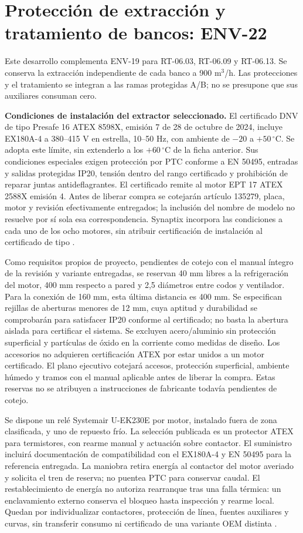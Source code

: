 \section{Protección de extracción y tratamiento de bancos: ENV-22}
\label{sec:ambiente-env22}
Este desarrollo complementa ENV-19 para RT-06.03, RT-06.09 y RT-06.13. Se conserva la extracción independiente de cada banco a 900 m$^3$/h. Las protecciones y el tratamiento se integran a las ramas protegidas A/B; no se presupone que sus auxiliares consuman cero.

\textbf{Condiciones de instalación del extractor seleccionado.} El certificado DNV de tipo Presafe 16 ATEX 8598X, emisión 7 de 28 de octubre de 2024, incluye EX180A-4 a 380--415 V en estrella, 10--50 Hz, con ambiente de $-20$ a $+50\,^{\circ}$C. Se adopta este límite, sin extenderlo a los $+60\,^{\circ}$C de la ficha anterior. Sus condiciones especiales exigen protección por PTC conforme a EN 50495, entradas y salidas protegidas IP20, tensión dentro del rango certificado y prohibición de reparar juntas antideflagrantes. El certificado remite al motor EPT 17 ATEX 2588X emisión 4. Antes de liberar compra se cotejarán artículo 135279, placa, motor y revisión efectivamente entregados; la inclusión del nombre de modelo no resuelve por sí sola esa correspondencia. Synaptix incorpora las condiciones a cada uno de los ocho motores, sin atribuir certificación de instalación al certificado de tipo \parencite[pp.~1--3]{lote22-ex-cert}.

Como requisitos propios de proyecto, pendientes de cotejo con el manual íntegro de la revisión y variante entregadas, se reservan 40 mm libres a la refrigeración del motor, 400 mm respecto a pared y 2,5 diámetros entre codos y ventilador. Para la conexión de 160 mm, esta última distancia es 400 mm. Se especifican rejillas de aberturas menores de 12 mm, cuya aptitud y durabilidad se comprobarán para satisfacer IP20 conforme al certificado; no basta la abertura aislada para certificar el sistema. Se excluyen acero/aluminio sin protección superficial y partículas de óxido en la corriente como medidas de diseño. Los accesorios no adquieren certificación ATEX por estar unidos a un motor certificado. El plano ejecutivo cotejará accesos, protección superficial, ambiente húmedo y tramos con el manual aplicable antes de liberar la compra. Estas reservas no se atribuyen a instrucciones de fabricante todavía pendientes de cotejo.

Se dispone un relé Systemair U-EK230E por motor, instalado fuera de zona clasificada, y uno de repuesto frío. La selección publicada es un protector ATEX para termistores, con rearme manual y actuación sobre contactor. El suministro incluirá documentación de compatibilidad con el EX180A-4 y EN 50495 para la referencia entregada. La maniobra retira energía al contactor del motor averiado y solicita el tren de reserva; no puentea PTC para conservar caudal. El restablecimiento de energía no autoriza rearranque tras una falla térmica: un enclavamiento externo conserva el bloqueo hasta inspección y rearme local. Quedan por individualizar contactores, protección de línea, fuentes auxiliares y curvas, sin transferir consumo ni certificado de una variante OEM distinta \parencite{lote22-systemair-uek}.

